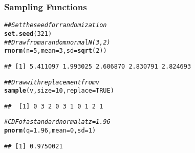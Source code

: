 \documentclass{beamer}\usepackage[]{graphicx}\usepackage[]{color}
\makeatletter
\newcommand{\hlnum}[1]{\textcolor[rgb]{0.686,0.059,0.569}{#1}}%
\newcommand{\hlcom}[1]{\textcolor[rgb]{0.678,0.584,0.686}{\textit{#1}}}%
\newcommand{\hlstd}[1]{\textcolor[rgb]{0.345,0.345,0.345}{#1}}%
\newcommand{\hlkwc}[1]{\textcolor[rgb]{0.333,0.667,0.333}{#1}}%
\newcommand{\hlkwd}[1]{\textcolor[rgb]{0.737,0.353,0.396}{\textbf{#1}}}%
\newenvironment{kframe}{%
 \def\at@end@of@kframe{}%
 \ifinner\ifhmode%
  \def\at@end@of@kframe{\end{minipage}}%
  \begin{minipage}{\columnwidth}%
 \fi\fi%
 \def\FrameCommand##1{\hskip\@totalleftmargin \hskip-\fboxsep
 \colorbox{shadecolor}{##1}\hskip-\fboxsep
     \hskip-\linewidth \hskip-\@totalleftmargin \hskip\columnwidth}%
 \MakeFramed {\advance\hsize-\width
   \@totalleftmargin\z@ \linewidth\hsize
   \@setminipage}}%
 {\par\unskip\endMakeFramed%
 \at@end@of@kframe}
\newenvironment{knitrout}{}{} %
\makeatother
\begin{document}
\begin{frame}[fragile]\frametitle{Sampling Functions}
\begin{knitrout}\footnotesize
{}\color{fgcolor}\begin{kframe}
\begin{alltt}
\hlcom{## Set the seed for randomization}
\hlkwd{set.seed}\hlstd{(}\hlnum{321}\hlstd{)}
\hlcom{## Draw from a random normal N(3, 2)}
\hlkwd{rnorm}\hlstd{(}\hlkwc{n} \hlstd{=} \hlnum{5}\hlstd{,} \hlkwc{mean} \hlstd{=} \hlnum{3}\hlstd{,} \hlkwc{sd} \hlstd{=} \hlkwd{sqrt}\hlstd{(}\hlnum{2}\hlstd{))}
\end{alltt}
\begin{verbatim}
## [1] 5.411097 1.993025 2.606870 2.830791 2.824693
\end{verbatim}
\begin{alltt}
\hlcom{## Draw with replacement from v}
\hlkwd{sample}\hlstd{(v,} \hlkwc{size} \hlstd{=} \hlnum{10}\hlstd{,} \hlkwc{replace} \hlstd{=} \hlnum{TRUE}\hlstd{)}
\end{alltt}
\begin{verbatim}
##  [1] 0 3 2 0 3 1 0 1 2 1
\end{verbatim}
\begin{alltt}
\hlcom{# CDF of a standard normal at z = 1.96}
\hlkwd{pnorm}\hlstd{(}\hlkwc{q} \hlstd{=} \hlnum{1.96}\hlstd{,} \hlkwc{mean} \hlstd{=} \hlnum{0}\hlstd{,} \hlkwc{sd} \hlstd{=} \hlnum{1}\hlstd{)}
\end{alltt}
\begin{verbatim}
## [1] 0.9750021
\end{verbatim}
\end{kframe}
\end{knitrout}
\end{frame}
\end{document}
